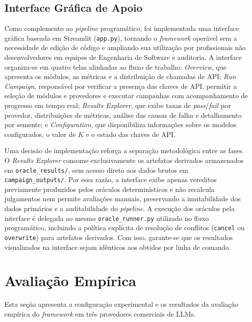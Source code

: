 \subsection{Interface Gráfica de Apoio}
\label{sec:interface}

Como complemento ao \textit{pipeline} programático, foi implementada uma interface gráfica baseada em Streamlit (\texttt{app.py}), tornando o \textit{framework} operável sem a necessidade de edição de código e ampliando sua utilização por profissionais não desenvolvedores em equipes de Engenharia de Software e auditoria. A interface organiza-se em quatro telas alinhadas ao fluxo de trabalho: \textit{Overview}, que apresenta os módulos, as métricas e a distribuição de chamadas de API; \textit{Run Campaign}, responsável por verificar a presença das chaves de API, permitir a seleção de módulos e provedores e executar campanhas com acompanhamento de progresso em tempo real; \textit{Results Explorer}, que exibe taxas de \textit{pass}/\textit{fail} por provedor, distribuições de métricas, análise das causas de falha e detalhamento por semente; e \textit{Configuration}, que disponibiliza informações sobre os modelos configurados, o valor de $K$ e o estado das chaves de API.

Uma decisão de implementação reforça a separação metodológica entre as fases. O \textit{Results Explorer} consome exclusivamente os artefatos derivados armazenados em \texttt{oracle\_results/}, sem acesso direto aos dados brutos em \texttt{campaign\_outputs/}. Por essa razão, a interface exibe apenas vereditos previamente produzidos pelos oráculos determinísticos e não recalcula julgamentos nem permite avaliações manuais, preservando a imutabilidade dos dados primários e a auditabilidade do \textit{pipeline}. A execução dos oráculos pela interface é delegada ao mesmo \texttt{oracle\_runner.py} utilizado no fluxo programático, incluindo a política explícita de resolução de conflitos (\texttt{cancel} ou \texttt{overwrite}) para artefatos derivados. Com isso, garante-se que os resultados visualizados na interface sejam idênticos aos obtidos por linha de comando.

\section{Avaliação Empírica}
\label{sec:avaliacao}

Esta seção apresenta a configuração experimental e os resultados da avaliação empírica do \textit{framework} em três provedores comerciais de LLMs.

